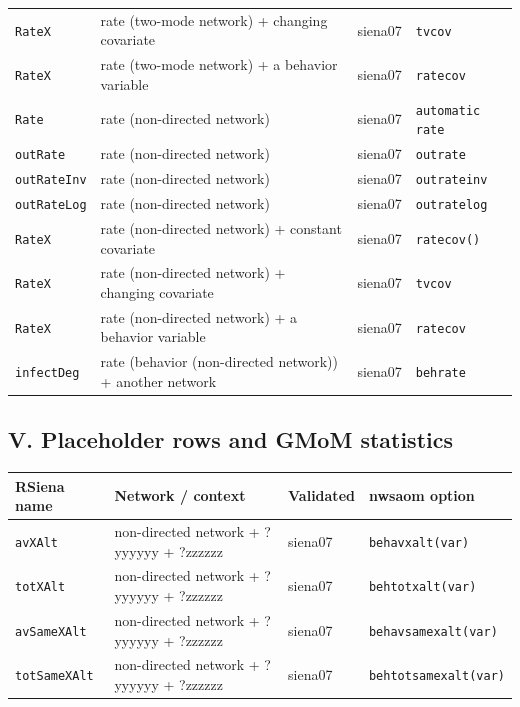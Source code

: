 \begin{longtable}{@{}p{2.6cm}p{3.2cm}p{2.9cm}p{5.4cm}@{}}
\texttt{RateX} & rate (two-mode network) + changing covariate & siena07 & \texttt{tvcov}\\
\texttt{RateX} & rate (two-mode network) + a behavior variable & siena07 & \texttt{ratecov}\\
\texttt{Rate} & rate (non-directed network) & siena07 & \texttt{automatic rate}\\
\texttt{outRate} & rate (non-directed network) & siena07 & \texttt{outrate}\\
\texttt{outRateInv} & rate (non-directed network) & siena07 & \texttt{outrateinv}\\
\texttt{outRateLog} & rate (non-directed network) & siena07 & \texttt{outratelog}\\
\texttt{RateX} & rate (non-directed network) + constant covariate & siena07 & \texttt{ratecov()}\\
\texttt{RateX} & rate (non-directed network) + changing covariate & siena07 & \texttt{tvcov}\\
\texttt{RateX} & rate (non-directed network) + a behavior variable & siena07 & \texttt{ratecov}\\
\texttt{infectDeg} & rate (behavior (non-directed network)) + another network & siena07 & \texttt{behrate}\\
\bottomrule
\end{longtable}
\normalsize

\subsection*{V. Placeholder rows and GMoM statistics}
\footnotesize
\begin{longtable}{@{}p{2.6cm}p{3.2cm}p{2.9cm}p{5.4cm}@{}}
\toprule
RSiena name & Network / context & Validated & nwsaom option\\
\midrule
\endhead
\texttt{avXAlt} & non-directed network + ?yyyyyy + ?zzzzzz & siena07 & \texttt{behavxalt(var)}\\
\texttt{totXAlt} & non-directed network + ?yyyyyy + ?zzzzzz & siena07 & \texttt{behtotxalt(var)}\\
\texttt{avSameXAlt} & non-directed network + ?yyyyyy + ?zzzzzz & siena07 & \texttt{behavsamexalt(var)}\\
\texttt{totSameXAlt} & non-directed network + ?yyyyyy + ?zzzzzz & siena07 & \texttt{behtotsamexalt(var)}\\
\bottomrule
\end{longtable}
\normalsize


